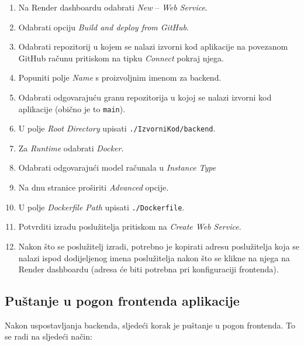\begin{enumerate}
	\item Na Render dashboardu odabrati \textit{New} -- \textit{Web Service}.
	\item Odabrati opciju \textit{Build and deploy from GitHub}.
	\item Odabrati repozitorij u kojem se nalazi izvorni kod aplikacije na povezanom GitHub računu pritiskom na tipku \textit{Connect} pokraj njega.
	\item Popuniti polje \textit{Name} s proizvoljnim imenom za backend.
	\item Odabrati odgovarajuću granu repozitorija u kojoj se nalazi izvorni kod aplikacije (obično je to \verb+main+).
	\item U polje \textit{Root Directory} upisati \verb+./IzvorniKod/backend+.
	\item Za \textit{Runtime} odabrati \textit{Docker}.
	\item Odabrati odgovarajući model računala u \textit{Instance Type}
	\item Na dnu stranice proširiti \textit{Advanced} opcije.
	\item U polje \textit{Dockerfile Path} upisati \verb+./Dockerfile+.
	\item Potvrditi izradu poslužitelja pritiskom na \textit{Create Web Service}.
	\item Nakon što se poslužitelj izradi, potrebno je kopirati adresu poslužitelja koja se nalazi ispod dodijeljenog imena poslužitelja nakon što se klikne na njega na Render dashboardu (adresa će biti potrebna pri konfiguraciji frontenda).
\end{enumerate}

\subsection{Puštanje u pogon frontenda aplikacije}

Nakon uspostavljanja backenda, sljedeći korak je puštanje u pogon frontenda. To se radi na sljedeći način:

